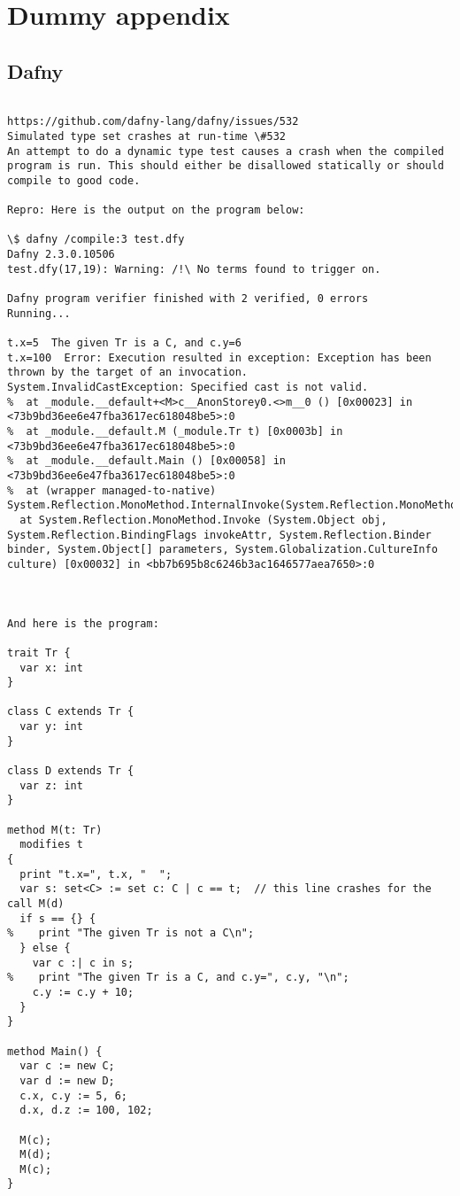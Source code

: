 \documentclass[12pt,openany,a4paper]{book}
\begin{document}
\chapter{Dummy appendix}

\section{Dafny}


\label {dafnybug1}

\begin{verbatim}

https://github.com/dafny-lang/dafny/issues/532
Simulated type set crashes at run-time \#532
An attempt to do a dynamic type test causes a crash when the compiled program is run. This should either be disallowed statically or should compile to good code.

Repro: Here is the output on the program below:

\$ dafny /compile:3 test.dfy
Dafny 2.3.0.10506
test.dfy(17,19): Warning: /!\ No terms found to trigger on.

Dafny program verifier finished with 2 verified, 0 errors
Running...

t.x=5  The given Tr is a C, and c.y=6
t.x=100  Error: Execution resulted in exception: Exception has been thrown by the target of an invocation.
System.InvalidCastException: Specified cast is not valid.
%  at _module.__default+<M>c__AnonStorey0.<>m__0 () [0x00023] in <73b9bd36ee6e47fba3617ec618048be5>:0
%  at _module.__default.M (_module.Tr t) [0x0003b] in <73b9bd36ee6e47fba3617ec618048be5>:0
%  at _module.__default.Main () [0x00058] in <73b9bd36ee6e47fba3617ec618048be5>:0
%  at (wrapper managed-to-native) System.Reflection.MonoMethod.InternalInvoke(System.Reflection.MonoMethod,object,object[],System.Exception&)
  at System.Reflection.MonoMethod.Invoke (System.Object obj, System.Reflection.BindingFlags invokeAttr, System.Reflection.Binder binder, System.Object[] parameters, System.Globalization.CultureInfo culture) [0x00032] in <bb7b695b8c6246b3ac1646577aea7650>:0



And here is the program:

trait Tr {
  var x: int
}

class C extends Tr {
  var y: int
}

class D extends Tr {
  var z: int
}

method M(t: Tr)
  modifies t
{
  print "t.x=", t.x, "  ";
  var s: set<C> := set c: C | c == t;  // this line crashes for the call M(d)
  if s == {} {
%    print "The given Tr is not a C\n";
  } else {
    var c :| c in s;
%    print "The given Tr is a C, and c.y=", c.y, "\n";
    c.y := c.y + 10;
  }
}

method Main() {
  var c := new C;
  var d := new D;
  c.x, c.y := 5, 6;
  d.x, d.z := 100, 102;

  M(c);
  M(d);
  M(c);
}

\end{verbatim}
\end{document}
